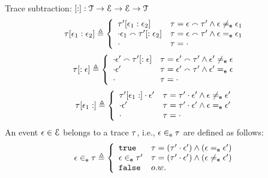 %
Trace subtraction: $[ : ] : \mathcal{{T} \to \mathcal{E} \to \mathcal{E} \to \mathcal{T}}$ 
\[
  \trace[\event_1 : \event_2] \triangleq
  \left\{
  \begin{array}{ll} 
  \trace'[\event_1: \event_2]             & \trace = \event \tracecat \trace' \land \event \eventneq \event_1 \\
  \cdot {} \event_1 \tracecat \trace'[:\event_2]  & \trace = \event \tracecat \trace' \land \event \eventeq \event_1 \\
  \cdot {} & \trace = \cdot \\
  \end{array}
  \right.
\]
\[
  \trace[:\event] \triangleq
  \left\{
  \begin{array}{ll} 
  \cdot {} \event' \tracecat \trace'[: \event]             & \trace = \event' \tracecat \trace' \land \event' \eventneq \event \\
  \cdot {} \event'  & \trace = \event' \tracecat \trace' \land \event' \eventeq \event \\
  \cdot  & \trace = \cdot \\
  \end{array}
  \right.
\]
\[
  \trace[\event_1 : ] \triangleq
  \left\{
  \begin{array}{ll} 
  \trace'[\event_1: ] \cdot \event'     & \trace = \trace'\cdot \event' \land \event \eventneq \event' \\
  \cdot {}\event'  & \trace = \trace' \cdot \event' \land \event \eventeq \event' \\
  \cdot  & \trace = \cdot
  \end{array}
  \right.
\]
%
An event $\mathtt{\epsilon} \in \mathcal{E}$ belongs to a trace $\mathtt{\tau}$, i.e., $\mathtt{\epsilon} \in_{\mathtt{e}} \mathtt{\tau}$ are defined as follows:
%
\begin{equation}
  \event \eventin \trace  
  \triangleq \left\{
  \begin{array}{ll} 
    \etrue                  & \trace =  (\trace' \cdot \event') \land (\event \eventeq \event')
                              \\
    \event \eventin \trace' & \trace =  (\trace' \cdot \event') \land (\event \eventneq \event') \\ 
    \efalse                 & o.w.
  \end{array}
  \right.
\end{equation}
